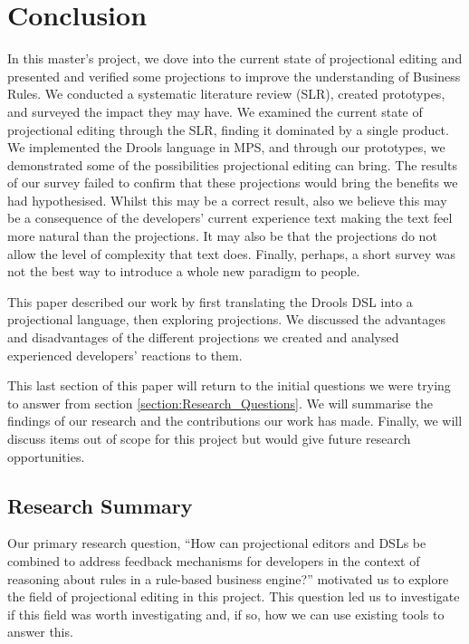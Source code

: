 \chapter{Conclusion}
\label{chapter:Conclusion}

In this master's project, we dove into the current state of projectional editing and presented and verified some projections to improve the understanding of Business Rules.
We conducted a systematic literature review (SLR), created prototypes, and surveyed the impact they may have.
We examined the current state of projectional editing through the SLR, finding it dominated by a single product.
We implemented the Drools language in MPS, and through our prototypes, we demonstrated some of the possibilities projectional editing can bring.
The results of our survey failed to confirm that these projections would bring the benefits we had hypothesised.
Whilst this may be a correct result, also we believe this may be a consequence of the developers' current experience text making the text feel more natural than the projections.
It may also be that the projections do not allow the level of complexity that text does.
Finally, perhaps, a short survey was not the best way to introduce a whole new paradigm to people.  

This paper described our work by first translating the Drools DSL into a projectional language, then exploring projections.
We discussed the advantages and disadvantages of the different projections we created and analysed experienced developers' reactions to them.

This last section of this paper will return to the initial questions we were trying to answer from section \ref{section:Research_Questions}.
We will summarise the findings of our research and the contributions our work has made.
Finally, we will discuss items out of scope for this project but would give future research opportunities.

\section{Research Summary}
Our primary research question, ``How can projectional editors and DSLs be combined to address feedback mechanisms for developers in the context of reasoning about rules in a rule-based business engine?'' motivated us to explore the field of projectional editing in this project.
This question led us to investigate if this field was worth investigating and, if so, how we can use existing tools to answer this.

